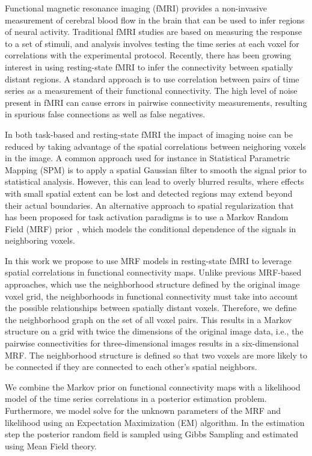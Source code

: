 \documentclass[runningheads,a4paper]{llncs}
\begin{document}
Functional magnetic resonance imaging (fMRI) provides a non-invasive measurement
of cerebral blood flow in the brain that can be used to infer regions of neural
activity. Traditional fMRI studies are based on measuring the response to a set
of stimuli, and analysis involves testing the time series at each voxel for
correlations with the experimental protocol. Recently, there has been growing
interest in using resting-state fMRI to infer the connectivity between spatially
distant regions. A standard approach is to use correlation between pairs of time
series as a measurement of their functional connectivity. The high level of
noise present in fMRI can cause errors in pairwise connectivity measurements,
resulting in spurious false connections as well as false negatives.

In both task-based and resting-state fMRI the impact of imaging noise can be
reduced by taking advantage of the spatial correlations between neighoring
voxels in the image. A common approach used for instance in Statistical
Parametric Mapping (SPM)\cite{worsley_analysis_1995} is to apply a spatial
Gaussian filter to smooth the signal prior to statistical analysis. However,
this can lead to overly blurred results, where effects with small spatial extent
can be lost and detected regions may extend beyond their actual boundaries. An
alternative approach to spatial regularization that has been proposed for task
activation paradigms is to use a Markov Random Field (MRF)
prior~\cite{ou_spatial_2005,descombes_spatio-temporal_1998,descombes_fmri_1998,woolrich_fully_2004,cosman_exact_2004},
which models the conditional dependence of the signals in neighboring voxels.

In this work we propose to use MRF models in resting-state fMRI to
leverage spatial correlations in functional connectivity maps. Unlike previous
MRF-based approaches, which use the neighborhood structure defined by the
original image voxel grid, the neighborhoods in functional connectivity must
take into account the possible relationships between spatially distant
voxels. Therefore, we define the neighborhood graph on the set of all voxel
pairs. This results in a Markov structure on a grid with twice the dimensions of
the original image data, i.e., the pairwise connectivities for three-dimensional
images results in a six-dimensional MRF. The neighborhood structure
is defined so that two voxels are more likely to be connected if they are
connected to each other's spatial neighbors.

We combine the Markov prior on functional connectivity maps with a likelihood
model of the time series correlations in a posterior estimation problem.
Furthermore, we model solve for the unknown parameters of the MRF and likelihood
using an Expectation Maximization (EM) algorithm. In the estimation step the
posterior random field is sampled using Gibbs Sampling and estimated using Mean
Field theory.
\end{document}
